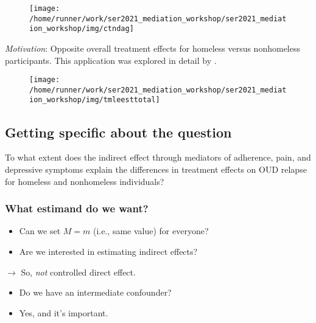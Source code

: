 \documentclass[
  12pt,
]{book}
\providecommand{\tightlist}{%
  \setlength{\itemsep}{0pt}\setlength{\parskip}{0pt}}
\theoremstyle{definition}
\theoremstyle{definition}
\theoremstyle{definition}
\newcommand{\1}{\mathbbm{1}}
\begin{document}
\begin{figure}

{\centering \texttt{[image: /home/runner/work/ser2021\_mediation\_workshop/ser2021\_mediation\_workshop/img/ctndag]} 

}

\end{figure}

\emph{Motivation}: Opposite overall treatment effects for homeless versus
nonhomeless participants. This application was explored in detail by
\citet{rudolph2020explaining}.

\begin{figure}

{\centering \texttt{[image: /home/runner/work/ser2021\_mediation\_workshop/ser2021\_mediation\_workshop/img/tmleesttotal]} 

}

\end{figure}

\hypertarget{getting-specific-about-the-question}{%
\subsection{Getting specific about the question}\label{getting-specific-about-the-question}}

To what extent does the indirect effect through mediators of adherence, pain, and
depressive symptoms explain the differences in treatment effects on OUD relapse
for homeless and nonhomeless individuals?

\hypertarget{what-estimand-do-we-want}{%
\subsubsection*{What estimand do we want?}\label{what-estimand-do-we-want}}


\begin{itemize}
\tightlist
\item
  Can we set \(M=m\) (i.e., same value) for everyone?
\item
  Are we interested in estimating indirect effects?
\end{itemize}

\(\rightarrow\) So, \emph{not} controlled direct effect.

\begin{itemize}
\tightlist
\item
  Do we have an intermediate confounder?
\item
  Yes, and it's important.
\end{itemize}
\end{document}

